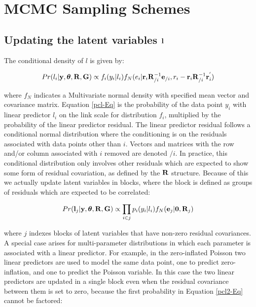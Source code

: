 \documentclass{article}
\begin{document}
\section{MCMC Sampling Schemes}
\label{MCMC-app}

\subsection[Updating the latent variables]{Updating the latent variables ${\bf l}$}

The conditional density of $l$ is given by:

\begin{equation}
Pr(l_{i}| {\bf y}, {\bm \theta}, {\bf R}, {\bf G}) \propto  f_{i}(y_{i} | l_{i})f_{N}(e_{i}|{\bf r}_{i}{\bf R}_{/i}^{-1}{\bf e}_{/i}, r_{i}-{\bf r}_{i}{\bf R}_{/i}^{-1}{\bf r}^{'}_{i})
\label{pcl-Eq}
\end{equation}

where $f_{N}$ indicates a Multivariate normal density with specified mean vector and covariance matrix.  Equation \ref{pcl-Eq} is the probability of the data point $y_{i}$ with linear predictor $l_{i}$ on the link scale for distribution $f_{i}$, multiplied by the probability of the linear predictor residual. The linear predictor residual follows a conditional normal distribution where the conditioning is on the residuals associated with data points other than $i$. Vectors and matrices with the row and/or column associated with $i$ removed are denoted $/i$.  In practice, this conditional distribution only involves other residuals which are expected to show some form of residual covariation, as defined by the ${\bf R}$ structure.  Because of this we actually update latent variables in blocks, where the block is defined as groups of residuals which are expected to be correlated:

\begin{equation}
Pr({\bf l}_{j}|{\bf y}, {\bm \theta}, {\bf R}, {\bf G}) \propto   \prod_{i \in j}{p}_{i}({y}_{i} | l_{i})f_{N}({\bf e}_{j}|{\bf 0}, {\bf R}_{j})
\label{pcl2-Eq}
\end{equation}

where $j$ indexes blocks of latent variables that have non-zero residual covariances.  A special case arises for multi-parameter distributions in which each parameter is  associated with a linear predictor. For example, in the zero-inflated Poisson two linear predictors are used to model the same data point, one to predict zero-inflation, and one to predict the Poisson variable. In this case the two linear predictors are updated in a single block even when the residual covariance between them is set to zero, because the first probability in Equation \ref{pcl2-Eq} cannot be factored:
\end{document}
